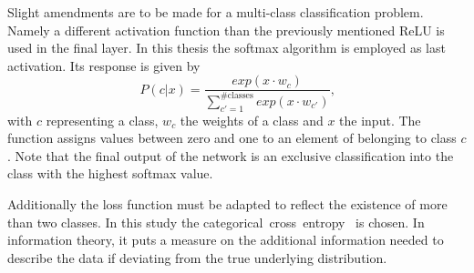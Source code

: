Slight amendments are to be made for a multi-class classification problem. Namely a different activation function than the previously mentioned ReLU is used in the final layer. In this thesis the softmax algorithm is employed as last activation. Its response is given by
\begin{equation}
	P(c | x) = \frac{exp(x \cdot w_c)}{\sum \limits_{c' = 1}^{\#\text{classes}} exp(x \cdot w_{c'})}
	\text{,}
\end{equation}
with $c$ representing a class, $w_c$ the weights of a class and $x$ the input. The function assigns values between zero and one to an element of belonging to class $c$. Note that the final output of the network is an exclusive classification into the class with the highest softmax value.

Additionally the loss function must be adapted to reflect the existence of more than two classes. In this study the categorical~cross~entropy~\cite{MachineLearning:LinearClassification} is chosen. In information theory, it puts a measure on the additional information needed to describe the data if deviating from the true underlying distribution.
